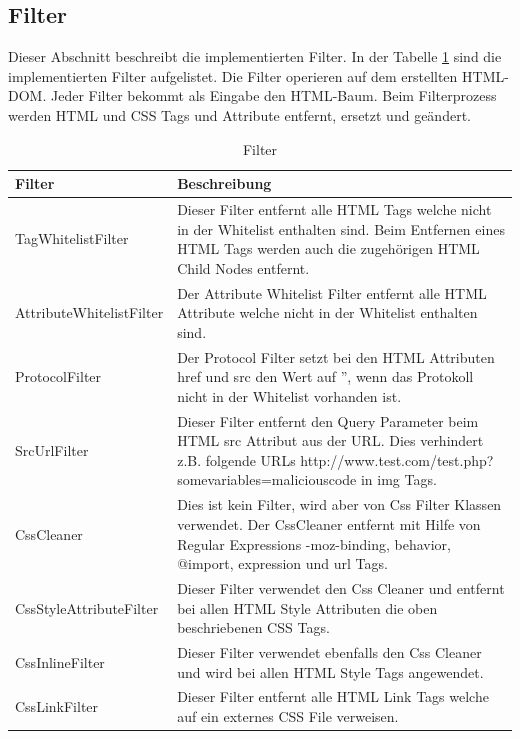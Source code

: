 \newpage

\subsection{Filter}

Dieser Abschnitt beschreibt die implementierten Filter. 
In der Tabelle \ref{tab:filter} sind die implementierten Filter aufgelistet. Die Filter operieren auf dem erstellten HTML-DOM.
Jeder Filter bekommt als Eingabe den HTML-Baum. Beim Filterprozess werden HTML und CSS Tags und Attribute entfernt, ersetzt und geändert.
\newline

\begin{table}[H]
\begin{center}
\begin{tabular}{l p{10.5cm} }
\hline
\textbf{Filter} & \textbf{Beschreibung} \\ \hline \hline
TagWhitelistFilter & Dieser Filter entfernt alle HTML Tags welche nicht in der Whitelist enthalten sind. 
Beim Entfernen eines HTML Tags werden auch die zugehörigen HTML Child Nodes entfernt. \\ 

AttributeWhitelistFilter & Der Attribute Whitelist Filter entfernt alle HTML Attribute welche nicht in der Whitelist enthalten sind. \\

ProtocolFilter & Der Protocol Filter setzt bei den HTML Attributen href und src den Wert auf '', wenn das Protokoll nicht in der Whitelist vorhanden ist. \\

SrcUrlFilter & Dieser Filter entfernt den Query Parameter beim HTML src Attribut aus der URL. Dies verhindert z.B. folgende URLs http://www.test.com/test.php?somevariables=maliciouscode in img Tags. \\

CssCleaner & Dies ist kein Filter, wird aber von Css Filter Klassen verwendet. Der CssCleaner entfernt mit Hilfe von Regular Expressions -moz-binding, behavior, @import, expression und url Tags. \\

CssStyleAttributeFilter & Dieser Filter verwendet den Css Cleaner und entfernt bei allen HTML Style Attributen die oben beschriebenen CSS Tags. \\

CssInlineFilter & Dieser Filter verwendet ebenfalls den Css Cleaner und wird bei allen HTML Style Tags angewendet. \\

CssLinkFilter & Dieser Filter entfernt alle HTML Link Tags welche auf ein externes CSS File verweisen. \\

\hline \hline
\end{tabular}
\caption{Filter}
\label{tab:filter}
\end{center}
\end{table}

